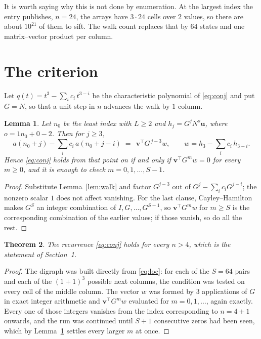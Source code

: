\documentclass[11pt,a4paper]{article}
\theoremstyle{plain}
\newtheorem{theorem}{Theorem}
\newtheorem{lemma}[theorem]{Lemma}
\theoremstyle{definition}
\begin{document}
It is worth saying why this is not done by enumeration. At the largest index the entry
publishes, $n=24$, the arrays have $3\cdot24$ cells over
$2$ values, so there are about $10^{21}$ of them to sift. The
walk count replaces that by $64$ states and one matrix--vector product per column.
\section{The criterion}

Let $q(t)=t^{3}-\sum_i c_i\,t^{3-i}$ be the characteristic polynomial of
\eqref{eq:conj} and put $G=N$, so that a unit step in $n$ advances the walk by
$1$ column.

\begin{lemma}\label{lem:crit}
Let $n_0$ be the least index with $L\ge2$ and $h_j=G^{j}N^{o}\mathbf{u}$, where
$o=1n_0+0-2$. Then for $j\ge3$,
\[
a(n_0+j)-\sum_i c_i\,a(n_0+j-i)\;=\;\,\mathbf{v}^{\!\top}G^{\,j-3}w,
\qquad w=h_{3}-\sum_i c_i\,h_{3-i} .
\]
Hence \eqref{eq:conj} holds from that point on if and only if
$\mathbf{v}^{\!\top}G^{m}w=0$ for every $m\ge0$, and it is enough to check
$m=0,1,\dots,S-1$.
\end{lemma}

\begin{proof}
Substitute Lemma~\ref{lem:walk} and factor $G^{j-3}$ out of
$G^{j}-\sum_ic_iG^{j-i}$; the nonzero scalar $1$ does not affect
vanishing. For the last clause, Cayley--Hamilton makes $G^{S}$ an integer combination of
$I,G,\dots,G^{S-1}$, so $\mathbf{v}^{\!\top}G^{m}w$ for $m\ge S$ is the corresponding
combination of the earlier values; if those vanish, so do all the rest.
\end{proof}

\begin{theorem}
The recurrence \eqref{eq:conj} holds for every $n>4$, which is the statement of
Section~1.
\end{theorem}

\begin{proof}
The digraph was built directly from \eqref{eq:loc}: for each of the $S=64$ pairs and each
of the $(1+1)^{3}$ possible next columns, the condition was tested on every cell of
the middle column. The vector $w$ was formed by $3$ applications of $G$ in exact integer
arithmetic and $\mathbf{v}^{\!\top}G^{m}w$ evaluated for $m=0,1,\dots$, again exactly.
Every one of those integers vanishes from the index corresponding to $n=4+1$ onwards,
and the run was continued until $S+1$ consecutive zeros had been seen, which by
Lemma~\ref{lem:crit} settles every larger $m$ at once.
\end{proof}
\end{document}

